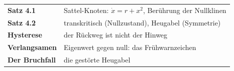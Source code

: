 \begin{merksatz}
\begin{center}
\renewcommand{\arraystretch}{1.5}
\begin{tabular}{@{}P{3.0cm}P{5.6cm}@{}}
\toprule
\textbf{Satz 4.1} & Sattel-Knoten: $\dot x = r + x^{2}$, Berührung der Nullklinen\\
\textbf{Satz 4.2} & transkritisch (Nullzustand), Heugabel (Symmetrie)\\
\textbf{Hysterese} & der Rückweg ist nicht der Hinweg\\
\textbf{Verlangsamen} & Eigenwert gegen null: das Frühwarnzeichen\\
\textbf{Der Bruchfall} & die gestörte Heugabel\\
\bottomrule
\end{tabular}
\end{center}

\begin{center}
\begin{minipage}{0.88\textwidth}
\end{minipage}
\end{center}
\end{merksatz}
